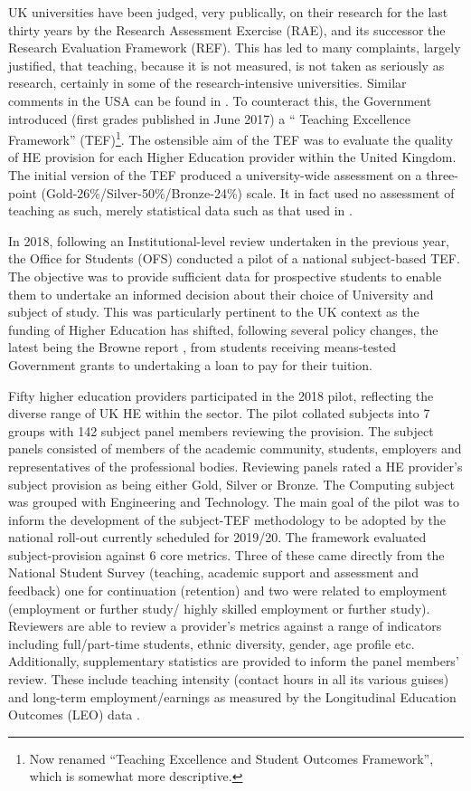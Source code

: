\documentclass[sigconf]{acmart}
\begin{document}
UK universities have been judged, very publically, on their research
for the last thirty years by the Research Assessment Exercise (RAE), and its successor the Research Evaluation Framework (REF). This has led to many complaints, largely justified, that teaching, because it is not measured, is not taken as seriously as research, certainly in some of the research-intensive universities. Similar comments in the USA can be found in \cite{Campbelletal2018a}. To counteract this, the Government introduced (first grades published in June 2017) a `` Teaching Excellence Framework'' (TEF)\footnote{Now renamed ``Teaching Excellence and Student Outcomes Framework'', which is somewhat more descriptive.}. The ostensible aim of the TEF was to evaluate the quality of HE provision for each Higher Education provider within the United Kingdom.
The initial version of the TEF produced a university-wide assessment on a three-point (Gold-26\%/Silver-50\%/Bronze-24\%) scale. It in fact used no assessment of teaching as such, merely statistical data such as that used in \cite{Shadbolt2016a}.

In 2018, following an Institutional-level review undertaken in the previous year, the Office for Students (OFS) conducted a pilot of a national  subject-based TEF. The objective was to provide sufficient data for prospective students to enable them to undertake an informed decision about their choice of University and subject of study. This was particularly pertinent to the UK context as the funding of Higher Education has shifted, following several policy changes, the latest being the
Browne report \cite{BIS2010a}, from students receiving means-tested Government grants to undertaking a loan to pay for their tuition. %

Fifty higher education providers participated in the 2018 pilot, reflecting the diverse range of UK HE within the sector. The pilot collated subjects into 7 groups with 142 subject panel members reviewing the provision. The subject panels consisted of members of the academic community, students, employers and representatives of the professional bodies. Reviewing panels rated a HE provider's subject provision as being either Gold, Silver or Bronze. The Computing subject was grouped with Engineering and Technology. The main goal of the pilot was to inform the development of the subject-TEF methodology to be adopted by the national roll-out currently scheduled for 2019/20. The framework evaluated subject-provision against 6 core metrics. Three of these came directly from the National Student Survey (teaching, academic support and assessment and feedback) one for continuation (retention) and two were related to employment (employment or further study/ highly skilled employment or further study). Reviewers are able to review a provider's metrics against a range of indicators %
including full/part-time students, ethnic diversity, gender, age profile etc. Additionally, supplementary statistics are provided to inform the panel members' review. These include teaching intensity (contact hours in all its various guises) and long-term employment/earnings as measured by the Longitudinal Education Outcomes (LEO) data \cite{DfE2017a}.
\end{document}
